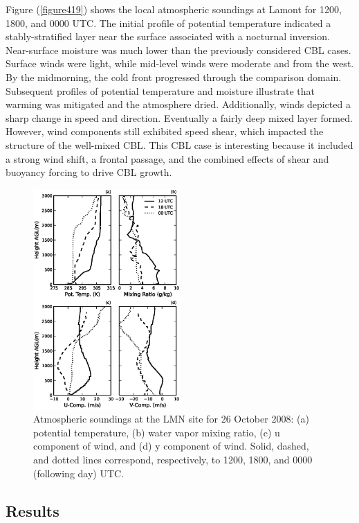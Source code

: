 Figure (\autoref{figure419}) shows the local atmospheric soundings at Lamont for 1200, 1800, and 0000 UTC. The initial profile of potential temperature indicated a stably-stratified layer near the surface associated with a nocturnal inversion. Near-surface moisture was much lower than the previously considered CBL cases. Surface winds were light, while mid-level winds were moderate and from the west. By the midmorning, the cold front progressed through the comparison domain. Subsequent profiles of potential temperature and moisture illustrate that warming was mitigated and the atmosphere dried. Additionally, winds depicted a sharp change in speed and direction. Eventually a fairly deep mixed layer formed. However, wind components still exhibited speed shear, which impacted the structure of the well-mixed CBL. This CBL case is interesting because it included a strong wind shift, a frontal passage, and the combined effects of shear and buoyancy forcing to drive CBL growth. 


\begin{figure}[H]
\begin{center}
\includegraphics[width=0.5\textwidth]{figures/chapter4/20081026_lmnsounding}
\end{center}
\caption{Atmospheric soundings at the LMN site for 26 October 2008: (a) potential temperature, (b) water vapor mixing ratio, (c) u component of wind, and (d) y component of wind. Solid, dashed, and dotted lines correspond, respectively, to 1200, 1800, and 0000 (following day) UTC.}
\label{figure419}
\end{figure}


\subsection{Results}
\label{res-452}

